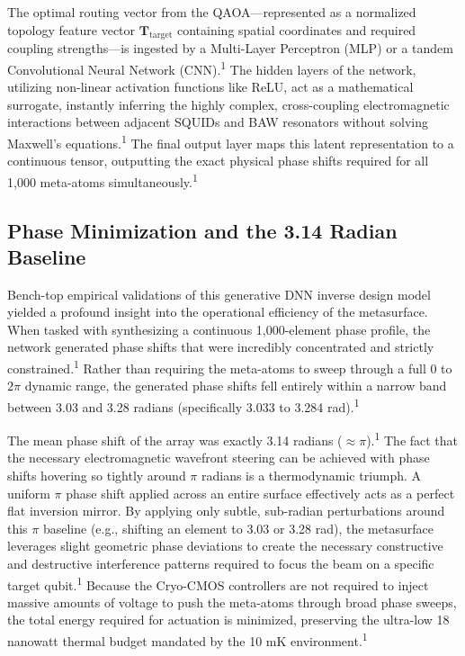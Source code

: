 \documentclass[11pt, a4paper]{article}
\begin{document}
The optimal routing vector from the QAOA---represented as a normalized topology feature vector $\mathbf{T}_{\mathrm{target}}$ containing spatial coordinates and required coupling strengths---is ingested by a Multi-Layer Perceptron (MLP) or a tandem Convolutional Neural Network (CNN).\textsuperscript{1} The hidden layers of the network, utilizing non-linear activation functions like ReLU, act as a mathematical surrogate, instantly inferring the highly complex, cross-coupling electromagnetic interactions between adjacent SQUIDs and BAW resonators without solving Maxwell's equations.\textsuperscript{1} The final output layer maps this latent representation to a continuous tensor, outputting the exact physical phase shifts required for all 1,000 meta-atoms simultaneously.\textsuperscript{1}

\subsection*{Phase Minimization and the 3.14 Radian Baseline}

Bench-top empirical validations of this generative DNN inverse design model yielded a profound insight into the operational efficiency of the metasurface. When tasked with synthesizing a continuous 1,000-element phase profile, the network generated phase shifts that were incredibly concentrated and strictly constrained.\textsuperscript{1} Rather than requiring the meta-atoms to sweep through a full $0$ to $2\pi$ dynamic range, the generated phase shifts fell entirely within a narrow band between 3.03 and 3.28 radians (specifically 3.033 to 3.284 rad).\textsuperscript{1}

The mean phase shift of the array was exactly 3.14 radians ($\approx \pi$).\textsuperscript{1} The fact that the necessary electromagnetic wavefront steering can be achieved with phase shifts hovering so tightly around $\pi$ radians is a thermodynamic triumph. A uniform $\pi$ phase shift applied across an entire surface effectively acts as a perfect flat inversion mirror. By applying only subtle, sub-radian perturbations around this $\pi$ baseline (e.g., shifting an element to 3.03 or 3.28 rad), the metasurface leverages slight geometric phase deviations to create the necessary constructive and destructive interference patterns required to focus the beam on a specific target qubit.\textsuperscript{1} Because the Cryo-CMOS controllers are not required to inject massive amounts of voltage to push the meta-atoms through broad phase sweeps, the total energy required for actuation is minimized, preserving the ultra-low 18 nanowatt thermal budget mandated by the 10 mK environment.\textsuperscript{1}
\end{document}
